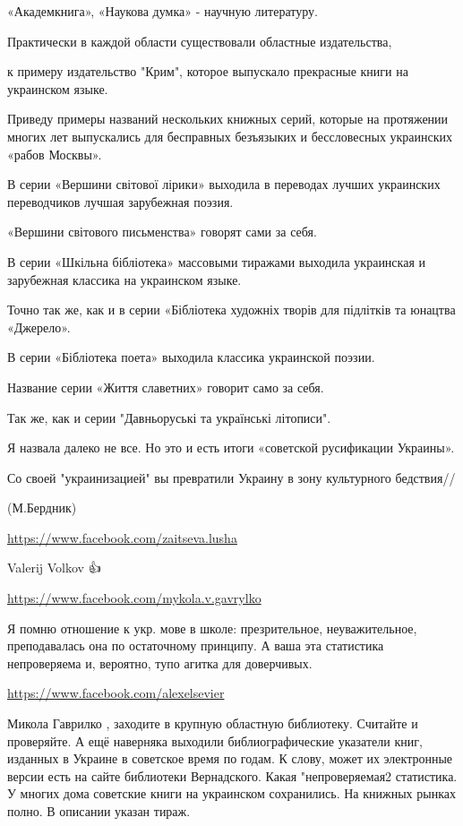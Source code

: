\documentclass[a4paper,11pt]{extreport}
\begin{document}
\begin{itemize}
«Академкнига», «Наукова думка» - научную литературу.

Практически в каждой области существовали областные издательства,

к примеру издательство "Крим", которое выпускало прекрасные книги на украинском языке.

Приведу примеры названий нескольких книжных серий, которые на протяжении многих лет выпускались для бесправных безъязыких и бессловесных украинских «рабов Москвы».

В серии «Вершини світової лірики» выходила в переводах лучших украинских переводчиков лучшая зарубежная поэзия.

«Вершини світового письменства» говорят сами за себя.

В серии «Шкільна бібліотека» массовыми тиражами выходила украинская и зарубежная классика на украинском языке.

Точно так же, как и в серии «Бібліотека художніх творів для підлітків та юнацтва «Джерело».

В серии «Бібліотека поета» выходила классика украинской поэзии.

Название серии «Життя славетних» говорит само за себя.

Так же, как и серии "Давньоруські та українські літописи".

Я назвала далеко не все. Но это и есть итоги «советской русификации Украины».

Со своей "украинизацией" вы превратили Украину в зону культурного бедствия//

(М.Бердник)

\begin{itemize}
\url{https://www.facebook.com/zaitseva.lusha}

Valerij Volkov 👍

\url{https://www.facebook.com/mykola.v.gavrylko}

Я помню отношение к укр. мове в школе: презрительное, неуважительное, преподавалась она по остаточному принципу. А ваша эта статистика непроверяема и, вероятно, тупо агитка для доверчивых.

\url{https://www.facebook.com/alexelsevier}

Микола Гаврилко , заходите в крупную областную библиотеку. Считайте и проверяйте. А ещё наверняка выходили библиографические указатели книг, изданных в Украине в советское время по годам. К слову, может их электронные версии есть на сайте библиотеки Вернадского. Какая "непроверяемая2 статистика. У многих дома советские книги на украинском сохранились. На книжных рынках полно. В описании указан тираж.


\end{itemize}
\end{itemize}
\end{document}
